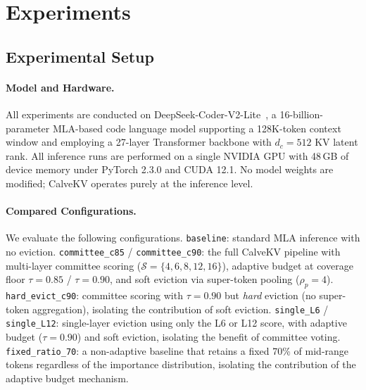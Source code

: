 \documentclass[letterpaper]{article} %
\begin{document}
\section{Experiments}


\subsection{Experimental Setup}

\paragraph{Model and Hardware.}
All experiments are conducted on DeepSeek-Coder-V2-Lite~\cite{deepseekv2},
a 16-billion-parameter MLA-based code language model supporting a 128K-token
context window and employing a 27-layer Transformer backbone with
$d_c = 512$ KV latent rank.
All inference runs are performed on a single NVIDIA GPU with 48\,GB of device
memory under PyTorch 2.3.0 and CUDA 12.1.
No model weights are modified; CalveKV operates purely at the inference level.

\paragraph{Compared Configurations.}
We evaluate the following configurations.
\texttt{baseline}: standard MLA inference with no eviction.
\texttt{committee\_c85} / \texttt{committee\_c90}: the full CalveKV pipeline
with multi-layer committee scoring ($\mathcal{S}=\{4,6,8,12,16\}$),
adaptive budget at coverage floor $\tau=0.85$ / $\tau=0.90$, and
soft eviction via super-token pooling ($\rho_p=4$).
\texttt{hard\_evict\_c90}: committee scoring with $\tau=0.90$ but
\emph{hard} eviction (no super-token aggregation), isolating the
contribution of soft eviction.
\texttt{single\_L6} / \texttt{single\_L12}: single-layer eviction using
only the L6 or L12 score, with adaptive budget ($\tau=0.90$) and soft
eviction, isolating the benefit of committee voting.
\texttt{fixed\_ratio\_70}: a non-adaptive baseline that retains a fixed
70\% of mid-range tokens regardless of the importance distribution,
isolating the contribution of the adaptive budget mechanism.
\end{document}
